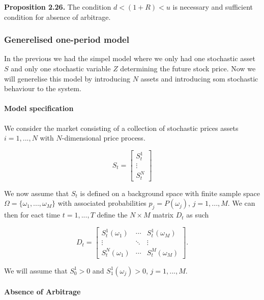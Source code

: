 \documentclass[
]{article}
\begin{document}
\textbf{Proposition 2.26.} The condition \(d<(1+R)<u\) is necessary and
sufficient condition for absence of arbitrage.

\hypertarget{generelised-one-period-model}{%
\subsubsection{Generelised one-period
model}\label{generelised-one-period-model}}

In the previous we had the simpel model where we only had one stochastic
asset \(S\) and only one stochastic variable \(Z\) determining the
future stock price. Now we will generelise this model by introducing
\(N\) assets and introducing som stochastic behaviour to the system.

\hypertarget{model-specification}{%
\paragraph{Model specification}\label{model-specification}}

We consider the market consisting of a collection of stochastic prices
assets \(i=1,...,N\) with \(N\)-dimensional price process.

\[
S_t=\begin{bmatrix} S_t^1\\
\vdots\\
S_t^N\end{bmatrix}
\]

We now assume that \(S_t\) is defined on a background space with finite
sample space \(\Omega = \{\omega_1,...,\omega_M\}\) with associated
probabilities \(p_j=P(\omega_j)\), \(j=1,...,M\). We can then for eact
time \(t=1,...,T\) define the \(N\times M\) matrix \(D_t\) as such

\[
D_t=\begin{bmatrix} S_t^1(\omega_1)&\cdots &S_t^1(\omega_M)\\
\vdots &\ddots & \vdots\\
S_t^N(\omega_1) &\cdots&S_t^M(\omega_M)\end{bmatrix}.
\]

We will assume that \(S_0^1>0\) and \(S_1^1(\omega_j)>0\),
\(j=1,...,M\).

\hypertarget{absence-of-arbitrage}{%
\paragraph{Absence of Arbitrage}\label{absence-of-arbitrage}}
\end{document}
